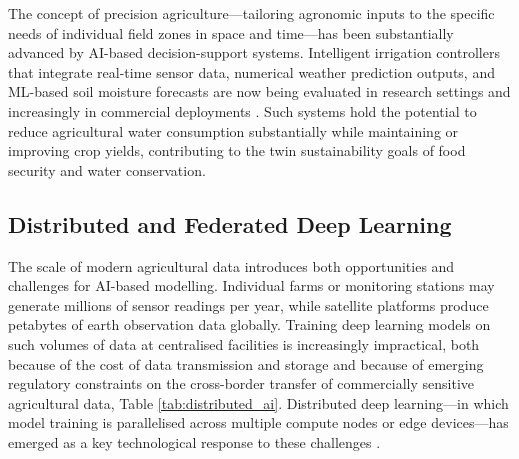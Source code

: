 \documentclass[land,article,submit,pdftex,moreauthors]{Definitions/mdpi}
\numberwithin{equation}{section}
\begin{document}
The concept of precision agriculture---tailoring agronomic inputs to the specific needs of individual field zones in space and time---has been substantially advanced by AI-based decision-support systems. Intelligent irrigation controllers that integrate real-time sensor data, numerical weather prediction outputs, and ML-based soil moisture forecasts are now being evaluated in research settings and increasingly in commercial deployments \citep{vij2020iot}. Such systems hold the potential to reduce agricultural water consumption substantially while maintaining or improving crop yields, contributing to the twin sustainability goals of food security and water conservation.

\subsection{Distributed and Federated Deep Learning}

The scale of modern agricultural data introduces both opportunities and challenges for AI-based modelling. Individual farms or monitoring stations may generate millions of sensor readings per year, while satellite platforms produce petabytes of earth observation data globally. Training deep learning models on such volumes of data at centralised facilities is increasingly impractical, both because of the cost of data transmission and storage and because of emerging regulatory constraints on the cross-border transfer of commercially sensitive agricultural data, Table \ref{tab:distributed_ai}. Distributed deep learning---in which model training is parallelised across multiple compute nodes or edge devices---has emerged as a key technological response to these challenges \citep{ben2019demystifying}.

\setcounter{table}{1}
\footnotesize
\setlength{\tabcolsep}{4pt}
\renewcommand{\arraystretch}{1.25}
\end{document}
